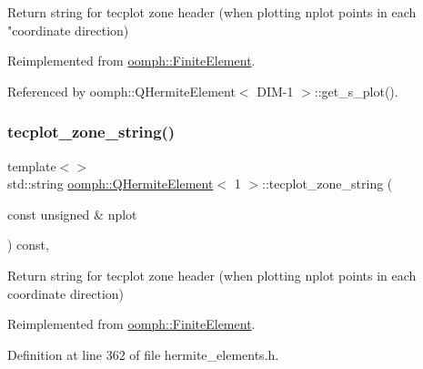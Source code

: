 Return string for tecplot zone header (when plotting nplot points in each "coordinate direction) 



Reimplemented from \hyperlink{classoomph_1_1FiniteElement_a3193df31f9ce38e0609d17a8ffb386c6}{oomph\+::\+Finite\+Element}.



Referenced by oomph\+::\+Q\+Hermite\+Element$<$ D\+I\+M-\/1 $>$\+::get\+\_\+s\+\_\+plot().

\mbox{\label{classoomph_1_1QHermiteElement_a0aeaeaf09670be9db120e578527a003e}} 
\subsubsection{\texorpdfstring{tecplot\+\_\+zone\+\_\+string()}{tecplot\_zone\_string()}\hspace{0.1cm}{\footnotesize\ttfamily [2/3]}}
{\footnotesize\ttfamily template$<$$>$ \\
std\+::string \hyperlink{classoomph_1_1QHermiteElement}{oomph\+::\+Q\+Hermite\+Element}$<$ 1 $>$\+::tecplot\+\_\+zone\+\_\+string (\begin{DoxyParamCaption}\item[{const unsigned \&}]{nplot }\end{DoxyParamCaption}) const\hspace{0.3cm}{\ttfamily [inline]}, {\ttfamily [virtual]}}

Return string for tecplot zone header (when plotting nplot points in each coordinate direction) 

Reimplemented from \hyperlink{classoomph_1_1FiniteElement_a3193df31f9ce38e0609d17a8ffb386c6}{oomph\+::\+Finite\+Element}.



Definition at line 362 of file hermite\+\_\+elements.\+h.

\mbox{\label{classoomph_1_1QHermiteElement_a1de256ecd9b74e749ee298f64c096557}} 
